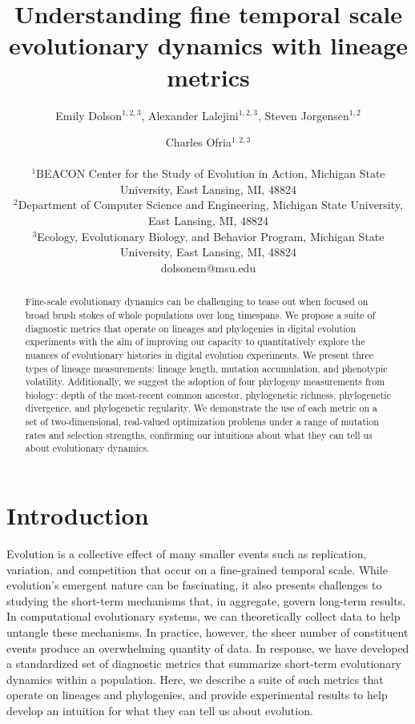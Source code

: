 \documentclass[letterpaper]{article}
\title{Understanding fine temporal scale evolutionary dynamics with lineage metrics}
\author{Emily Dolson$^{1,2,3}$, Alexander Lalejini$^{1,2, 3}$, Steven Jorgensen$^{1,2}$ \and Charles Ofria$^{1,2, 3}$ \\
\mbox{}\\
$^1$BEACON Center for the Study of Evolution in Action, Michigan State University, East Lansing, MI, 48824 \\
$^2$Department of Computer Science and Engineering, Michigan State University, East Lansing, MI, 48824 \\
$^3$Ecology, Evolutionary Biology, and Behavior Program, Michigan State University, East Lansing, MI, 48824 \\
dolsonem@msu.edu} %
\begin{document}
\maketitle

\begin{abstract}
Fine-scale evolutionary dynamics can be challenging to tease out when focused on broad brush stokes of whole populations over long timespans.
We propose a suite of diagnostic metrics that operate on lineages and phylogenies in digital evolution experiments with the aim of improving our capacity to quantitatively explore the nuances of evolutionary histories in digital evolution experiments.
We present three types of lineage measurements: lineage length, mutation accumulation, and phenotypic volatility. 
Additionally, we suggest the adoption of four phylogeny measurements from biology: depth of the most-recent common ancestor, phylogenetic richness, phylogenetic divergence, and phylogenetic regularity. 
We demonstrate the use of each metric on a set of two-dimensional, real-valued optimization problems under a range of mutation rates and selection strengths, confirming our intuitions about what they can tell us about evolutionary dynamics. 

\end{abstract}

\section{Introduction}

Evolution is a collective effect of many smaller events such as replication, variation, and competition that occur on a fine-grained temporal scale. While evolution's emergent nature %
can be
fascinating, it also presents challenges to studying the short-term mechanisms that, in aggregate, govern long-term results. In computational evolutionary systems, we can theoretically collect data to help untangle these mechanisms. In practice, however, %
the sheer number of constituent events produce an overwhelming quantity of data.
In response, we have developed
a standardized set of diagnostic metrics that summarize short-term evolutionary dynamics within a population. Here, we describe a suite of such metrics that operate on lineages and phylogenies, and provide experimental results to help develop an intuition for what they can tell us about evolution.
\end{document}
